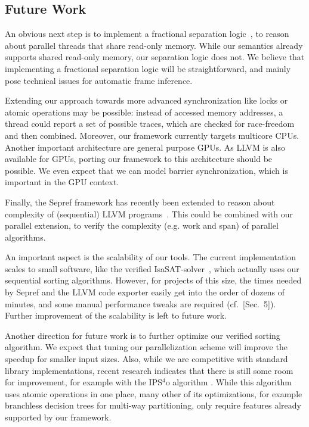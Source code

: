 \documentclass[sn-mathphys,Numbered]{sn-jnl}
\theoremstyle{thmstyleone}%
\theoremstyle{definition}%
\theoremstyle{thmstylethree}%
\begin{document}
%


    \subsection{Future Work}
      An obvious next step is to implement a fractional separation logic~\cite{BCOP05},
      to reason about parallel threads that share read-only memory. While our semantics
      already supports shared read-only memory, our separation logic does not.
      We believe that implementing a fractional separation logic will be straightforward,
      and mainly pose technical issues for automatic frame inference.

      Extending our approach towards more advanced
      synchronization like locks or atomic operations may be possible: instead of accessed memory addresses,
      a thread could report a set of possible traces, which are checked for race-freedom and then combined.
      Moreover, our framework currently targets multicore CPUs. Another important architecture are general purpose GPUs.
      As LLVM is also available for GPUs, porting our framework to this architecture should be possible.
      We even expect that we can model barrier synchronization, which is important in the GPU context.

      Finally, the Sepref framework has recently been extended to reason about complexity of (sequential)
      LLVM programs~\cite{HaLa21-toplas,HaLa21}. This could be combined with our parallel extension, to verify the
      complexity (e.g. work and span) of parallel algorithms.

      An important aspect is the scalability of our tools. The current implementation scales to small software, like the verified IsaSAT-solver~\cite{FlLa23}, which actually uses our sequential sorting algorithms. However, for projects of this size, the times needed by Sepref and the LLVM code exporter easily get into the order of dozens of minutes, and some manual performance tweaks are required (cf.~\cite{FlLa23}[Sec.~5]).
      Further improvement of the scalability is left to future work.

      Another direction for future work is to further optimize our verified sorting algorithm.
      We expect that tuning our parallelization scheme will improve the speedup for smaller input sizes.
      Also, while we are competitive with standard library implementations, recent research indicates that there is still
      some room for improvement, for example with the IPS$^4$o algorithm \cite{AWFS22}. While this algorithm uses atomic operations
      in one place, many other of its optimizations, for example branchless decision trees for multi-way partitioning,
      only require features already supported by our framework.
\end{document}

